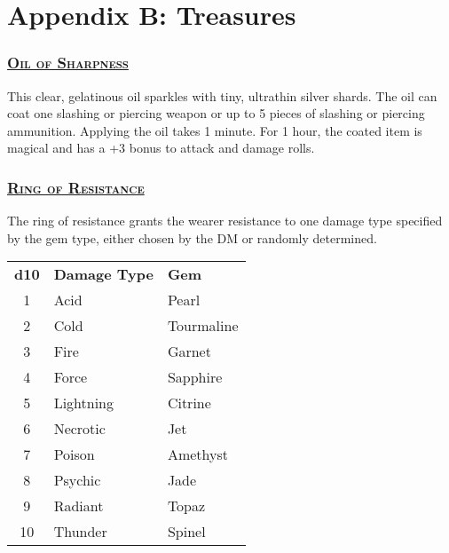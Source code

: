 \section{Appendix B: Treasures}

\begin{multicols*}{2}
	
\subsubsection*{\underline{\textsc{\Large Oil of Sharpness}}}
This clear, gelatinous oil sparkles with tiny, ultrathin silver shards. The oil can coat one slashing or piercing weapon or up to 5 pieces of slashing or piercing ammunition. Applying the oil takes 1 minute. For 1 hour, the coated item is magical and has a +3 bonus to attack and damage rolls.
	
\subsubsection*{\underline{\textsc{\Large Ring of Resistance}}}
The ring of resistance grants the wearer resistance to one damage type specified by the gem type, either chosen by the DM or randomly determined.

\begin{table}[H]
	\begin{tabular}{cll}
		\textbf{d10} & \textbf{Damage Type} & \textbf{Gem} \\
		1 & Acid & Pearl \\
		2 & Cold & Tourmaline \\
		3 & Fire & Garnet \\
		4 & Force & Sapphire \\
		5 & Lightning & Citrine \\
		6 & Necrotic & Jet \\
		7 & Poison & Amethyst \\
		8 & Psychic & Jade \\
		9 & Radiant & Topaz \\
		10 & Thunder & Spinel \\
	\end{tabular}
\end{table}


\end{multicols*}

\pagebreak